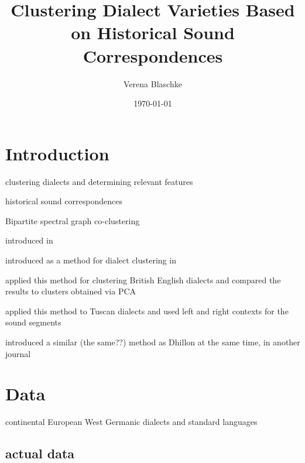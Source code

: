 \documentclass{article}
\title{Clustering Dialect Varieties Based on Historical Sound Correspondences}
\author{Verena Blaschke}
\date{\today}
\begin{document}
\maketitle
\newpage



\section{Introduction}


clustering dialects and determining relevant features

\cite{prokic2012detecting}


historical sound correspondences


Bipartite spectral graph co-clustering

introduced in \cite{dhillon2001co-clustering}

introduced as a method for dialect clustering in \cite{wieling2011bipartite}

\cite{wieling2013analyzing} applied this method for clustering British English dialects and compared the results to clusters obtained via PCA
 
\cite{montemagni2013synchronic} applied this method to Tuscan dialects and used left and right contexts for the sound segments

\cite{zha2001bipartite} introduced a similar (the same??) method as Dhillon at the same time, in another journal

 
\section{Data}

continental European West Germanic dialects and standard languages

\subsection{actual data}
\end{document}
